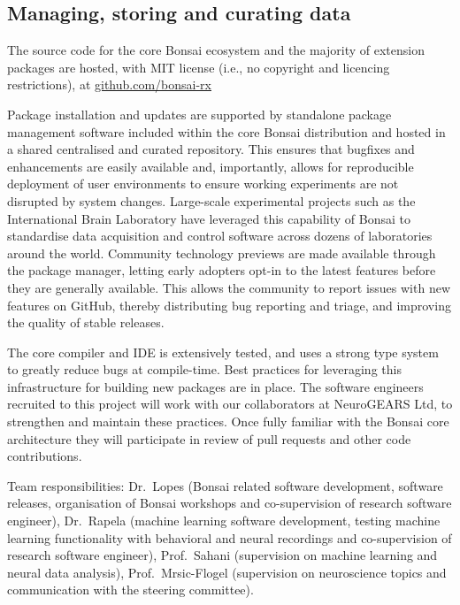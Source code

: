 \documentclass[a4paper,11pt]{article}
\begin{document}
\subsection{Managing, storing and curating data}

The source code for the core Bonsai ecosystem and the majority of extension
packages are hosted, with MIT license (i.e., no copyright and licencing
restrictions), at \url{github.com/bonsai-rx} 

Package installation and updates are supported by standalone package management
software included within the core Bonsai distribution and hosted in a shared
centralised and curated repository. This ensures that bugfixes and enhancements
are easily available and, importantly, allows for reproducible deployment of
user environments to ensure working experiments are not disrupted by system
changes.
%
Large-scale experimental projects such as the International Brain Laboratory
have leveraged this capability of Bonsai to standardise data acquisition and
control software across dozens of laboratories around the world.
%
Community technology previews are made available through the package manager,
letting early adopters opt-in to the latest features before they are generally
available. This allows the community to report issues with new features on
GitHub, thereby distributing bug reporting and triage, and improving the
quality of stable releases.

The core compiler and IDE is extensively tested, and uses a strong type system
to greatly reduce bugs at compile-time. Best practices for leveraging this
infrastructure for building new packages are in place. The software engineers
recruited to this project will work with our collaborators at NeuroGEARS Ltd,
to strengthen and maintain these practices. Once fully familiar with the Bonsai
core architecture they will participate in review of pull requests and other
code contributions.

Team responsibilities: Dr.~Lopes (Bonsai related software development, software
releases, organisation of Bonsai workshops and co-supervision of research
software engineer), Dr.~Rapela (machine learning software development, testing
machine learning functionality with behavioral and neural recordings and
co-supervision of research software engineer), Prof.~Sahani (supervision on
machine learning and neural data analysis), Prof.~Mrsic-Flogel (supervision on
neuroscience topics and communication with the steering committee).
\end{document}

